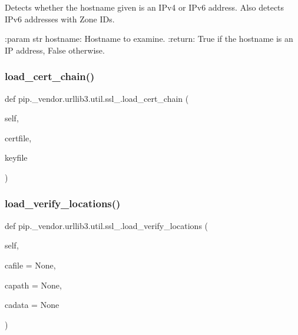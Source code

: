 \begin{DoxyVerb}Detects whether the hostname given is an IPv4 or IPv6 address.
Also detects IPv6 addresses with Zone IDs.

:param str hostname: Hostname to examine.
:return: True if the hostname is an IP address, False otherwise.
\end{DoxyVerb}
 \mbox{\label{namespacepip_1_1__vendor_1_1urllib3_1_1util_1_1ssl___a2381ea3fd57d4f68d29dfddb5a1dd9ee}} 
\subsubsection{\texorpdfstring{load\+\_\+cert\+\_\+chain()}{load\_cert\_chain()}}
{\footnotesize\ttfamily def pip.\+\_\+vendor.\+urllib3.\+util.\+ssl\+\_\+.\+load\+\_\+cert\+\_\+chain (\begin{DoxyParamCaption}\item[{}]{self,  }\item[{}]{certfile,  }\item[{}]{keyfile }\end{DoxyParamCaption})}

\mbox{\label{namespacepip_1_1__vendor_1_1urllib3_1_1util_1_1ssl___adc941602bd3213e4c3cff39b20ebfcf3}} 
\subsubsection{\texorpdfstring{load\+\_\+verify\+\_\+locations()}{load\_verify\_locations()}}
{\footnotesize\ttfamily def pip.\+\_\+vendor.\+urllib3.\+util.\+ssl\+\_\+.\+load\+\_\+verify\+\_\+locations (\begin{DoxyParamCaption}\item[{}]{self,  }\item[{}]{cafile = {\ttfamily None},  }\item[{}]{capath = {\ttfamily None},  }\item[{}]{cadata = {\ttfamily None} }\end{DoxyParamCaption})}

